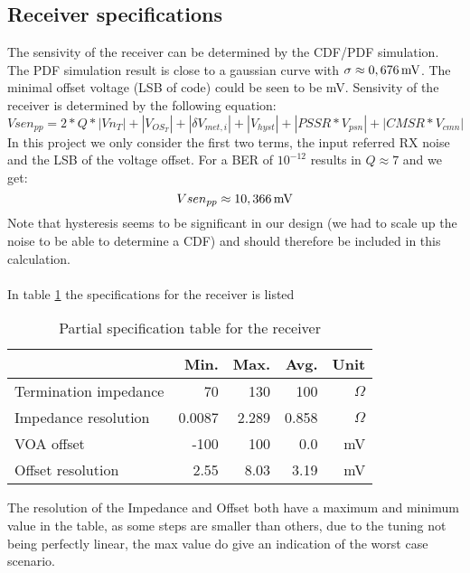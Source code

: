 \subsection{Receiver specifications }

The sensivity of the receiver can be determined by the CDF/PDF simulation. The PDF simulation result is close to a gaussian curve with $\sigma \approx \unit[0,676]{mV}$. The minimal offset voltage (LSB of code) could be seen to be \unit[0,9]{mV}. Sensivity of the receiver is determined by the following equation:
\[
 Vsen_{pp} = 2*Q*|Vn_T| + |V_{OS_T}| + |\delta V_{met,i}| + |V_{hyst}| + |PSSR*V_{psn}| + |CMSR*V_{cmn}|
\]
In this project we only consider the first two terms, the input referred RX noise and the LSB of the voltage offset. For a BER of $10^{-12}$ results in $Q\approx 7$ and we get:
\[
 Vsen_{pp} \approx \unit[10,366]{mV}
\]
Note that hysteresis seems to be significant in our design (we had to scale up the noise to be able to determine a CDF) and should therefore be included in this calculation.\\\\
In table \ref{tab:specifications} the specifications for the receiver is listed

\begin{table}[H]
  \centering
  \begin{tabular}{l|r|r|r|r}
    & Min. & Max. & Avg. & Unit \\
    \hline
	Termination impedance & 70 & 130 & 100 & $\Omega$\\
	Impedance resolution & 0.0087 & 2.289 & 0.858 & $\Omega$\\
	VOA offset & -100 & 100 & 0.0 & mV\\
	Offset resolution & 2.55 & 8.03 & 3.19 & mV\\
  \end{tabular}
  \caption{Partial specification table for the receiver}
  \label{tab:specifications}
\end{table}

The resolution of the Impedance and Offset both have a maximum and minimum value in the table, as some steps are smaller than others, due to the tuning not being perfectly linear, the max value do give an indication of the worst case scenario.